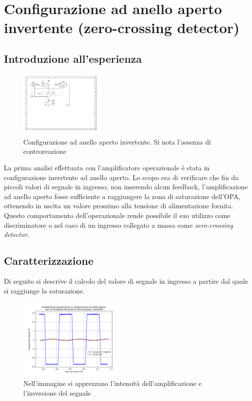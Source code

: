 \documentclass[journal]{IEEEtran}
\begin{document}
\section{\textbf{Configurazione ad anello aperto invertente (zero-crossing detector)}} %
\subsection{\textbf{Introduzione all'esperienza}}


\begin{figure}[h]%
\begin {center}
\includegraphics[width=0.38\textwidth]{sch-simulations/output/opa-open-loop-inverting.pdf}
\caption{Configurazione ad anello aperto invertente. Si nota l'assenza di controreazione}
\label{fig:circ_open_loop_inv}
\end {center}
\end{figure}

La prima analisi effettuata con l'amplificatore operazionale è stata in configurazione invertente ad anello aperto. Lo scopo era di verificare che fin da piccoli valori di segnale in ingresso, non inserendo alcun feedback, l'amplificazione ad anello aperto fosse sufficiente a raggiungere la zona di saturazione dell'OPA, ottenendo in uscita un valore prossimo alla tensione di alimentazione fornita.
Questo comportamento dell'operazionale rende possibile il suo utilizzo come discriminatore o nel caso di un ingresso collegato a massa come  \textit{zero-crossing detector}.

\subsection{\textbf{Caratterizzazione}}
Di seguito si descrive il calcolo del valore di segnale in ingresso a partire dal quale si raggiunge la saturazione.

\begin{figure}[h]%
\begin {center}
\includegraphics[width=0.48\textwidth]{analysis/output/opa-open-loop-inv-zero-crossing.pdf}
\caption{Nell'immagine si apprezzano l'intensità dell'amplificazione e l'inversione del segnale}
\label{fig:open_loop_inv_zc_1}
\end {center}
\end{figure}
\end{document}
